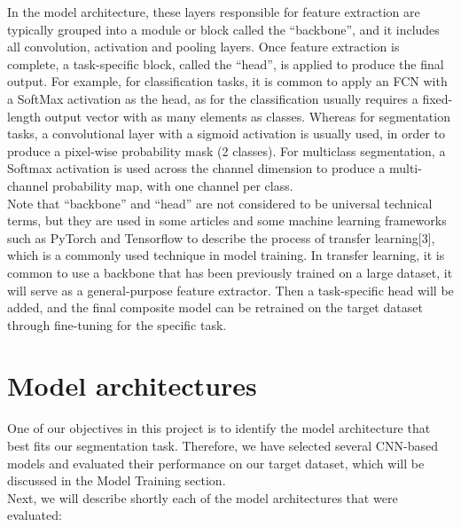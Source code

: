 In the model architecture, these layers responsible for feature extraction are typically grouped into a module or block called the “backbone”, and it includes all convolution, activation and pooling layers. Once feature extraction is complete, a task-specific block, called the “head”, is applied to produce the final output. For example, for classification tasks, it is common to apply an FCN with a SoftMax activation as the head, as for the classification usually requires a fixed-length output vector with as many elements as classes. Whereas for segmentation tasks, a convolutional layer with a sigmoid activation is usually used, in order to produce a pixel-wise probability mask (2 classes). For multiclass segmentation, a Softmax activation is used across the channel dimension to produce a multi-channel probability map, with one channel per class.\\


Note that “backbone” and “head” are not considered to be universal technical terms, but they are used in some articles and some machine learning frameworks such as PyTorch and Tensorflow to describe the process of transfer learning[3], which is a commonly used technique in model training. In transfer learning, it is common to use a backbone that has been previously trained on a large dataset, it will serve as a general-purpose feature extractor. Then a task-specific head will be added, and the final composite model can be retrained on the target dataset through fine-tuning for the specific task.\\

\section{Model architectures}
One of our objectives in this project is to identify the model architecture that best fits our segmentation task. Therefore, we have selected several CNN-based models and evaluated their performance on our target dataset, which will be discussed in the Model Training section.\\

Next, we will describe shortly each of the model architectures that were evaluated: 
